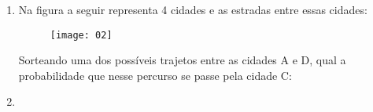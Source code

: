 \documentclass[twocolumn,oneside,a4paper,12pt]{article}
\begin{document}
\begin{enumerate}
\item Na figura a seguir representa 4 cidades e as estradas entre essas cidades:

	\begin{figure}[!tbh]
	\center
	\texttt{[image: 02]}
	\end{figure}

Sorteando uma dos possíveis trajetos entre as cidades A e D, qual a probabilidade que nesse percurso se passe pela cidade C:

\item  

\end{enumerate}

\FRASE
\end{document}
